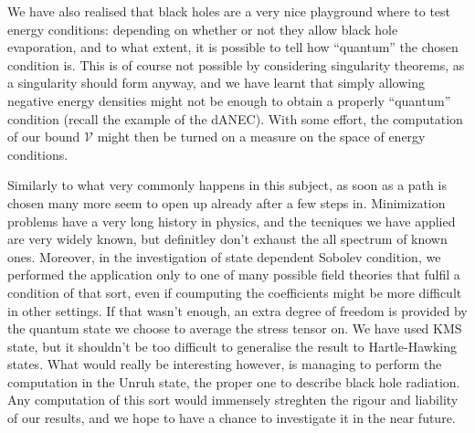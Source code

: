 We have also realised that black holes are a very nice playground where to test energy conditions: depending on whether or not they allow black hole evaporation, and to what extent, it is possible to tell how ``quantum'' the chosen condition is. This is of course not possible by considering singularity theorems, as a singularity should form anyway, and we have learnt that simply allowing negative energy densities might not be enough to obtain a properly ``quantum'' condition (recall the example of the dANEC). With some effort, the computation of our bound \(\mathcal{V}\) might then be turned on a measure on the space of energy conditions.

Similarly to what very commonly happens in this subject, as soon as a path is chosen many more seem to open up already after a few steps in.
Minimization problems have a very long history in physics, and the tecniques we have applied are very widely known, but definitley don't exhaust the all spectrum of known ones.
Moreover, in the investigation of state dependent Sobolev condition, we performed the application only to one of many possible field theories that fulfil a condition of that sort, even if coumputing the coefficients might be more difficult in other settings.
If that wasn't enough, an extra degree of freedom is provided by the quantum state we choose to average the stress tensor on. We have used KMS state, but it shouldn't be too difficult to generalise the result to Hartle-Hawking states.
What would really be interesting however, is managing to perform the computation in the Unruh state, the proper one to describe black hole radiation. Any computation of this sort would immensely streghten the rigour and liability of our results, and we hope to have a chance to investigate it in the near future.

